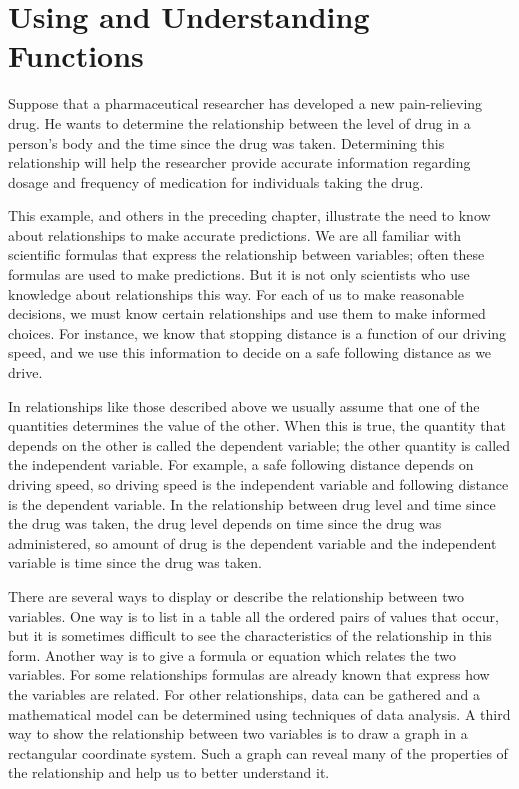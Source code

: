 \documentclass[10pt,]{book}
\theoremstyle{ptxdefinitionnotitle}
\theoremstyle{ptxdefinitiontitle}
\numberwithin{equation}{section}
\begin{document}
\section[{Using and Understanding Functions}]{Using and Understanding Functions}\label{chapter02-section01}
\hypertarget{p-2}{}%
Suppose that a pharmaceutical researcher has developed a new pain-relieving drug.  He wants to determine the relationship between the level of drug in a person’s body and the time since the drug was taken.  Determining this relationship will help the researcher provide accurate information regarding dosage and frequency of medication for individuals taking the drug.%
\par
\hypertarget{p-3}{}%
This example, and others in the preceding chapter, illustrate the need to know about relationships to make accurate predictions. We are all familiar with scientific formulas that express the relationship between variables; often these formulas are used to make predictions.  But it is not only scientists who use knowledge about relationships this way.  For each of us to make reasonable decisions, we must know certain relationships and use them to make informed choices.  For instance, we know that stopping distance is a function of our driving speed, and we use this information to decide on a safe following distance as we drive.%
\par
\hypertarget{p-4}{}%
In relationships like those described above we usually assume that one of the quantities determines the value of the other.  When this is true, the quantity that depends on the other is called the dependent variable; the other quantity is called the independent variable. For example, a safe following distance depends on driving speed, so driving speed is the independent variable and following distance is the dependent variable.  In the relationship between drug level and time since the drug was taken, the drug level depends on time since the drug was administered, so amount of drug is the dependent variable and the independent variable is time since the drug was taken.%
\par
\hypertarget{p-5}{}%
There are several ways to display or describe the relationship between two variables.  One way is to list in a table all the ordered pairs of values that occur, but it is sometimes difficult to see the characteristics of the relationship in this form.  Another way is to give a formula or equation which relates the two variables.  For some relationships formulas are already known that express how the variables are related.  For other relationships, data can be gathered and a mathematical model can be determined using techniques of data analysis.  A third way to show the relationship between two variables is to draw a graph in a rectangular coordinate system.  Such a graph can reveal many of the properties of the relationship and help us to better understand it.%
\end{document}
